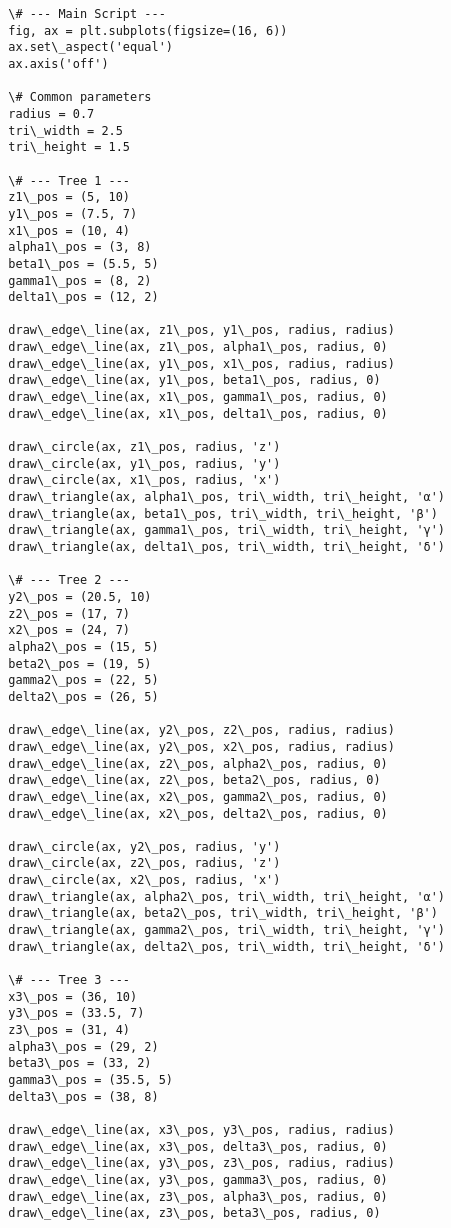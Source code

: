 \documentclass[11pt]{article}
\begin{document}
\begin{lstlisting}
  \# --- Main Script ---
  fig, ax = plt.subplots(figsize=(16, 6))
  ax.set\_aspect('equal')
  ax.axis('off')

  \# Common parameters
  radius = 0.7
  tri\_width = 2.5
  tri\_height = 1.5

  \# --- Tree 1 ---
  z1\_pos = (5, 10)
  y1\_pos = (7.5, 7)
  x1\_pos = (10, 4)
  alpha1\_pos = (3, 8)
  beta1\_pos = (5.5, 5)
  gamma1\_pos = (8, 2)
  delta1\_pos = (12, 2)

  draw\_edge\_line(ax, z1\_pos, y1\_pos, radius, radius)
  draw\_edge\_line(ax, z1\_pos, alpha1\_pos, radius, 0)
  draw\_edge\_line(ax, y1\_pos, x1\_pos, radius, radius)
  draw\_edge\_line(ax, y1\_pos, beta1\_pos, radius, 0)
  draw\_edge\_line(ax, x1\_pos, gamma1\_pos, radius, 0)
  draw\_edge\_line(ax, x1\_pos, delta1\_pos, radius, 0)

  draw\_circle(ax, z1\_pos, radius, 'z')
  draw\_circle(ax, y1\_pos, radius, 'y')
  draw\_circle(ax, x1\_pos, radius, 'x')
  draw\_triangle(ax, alpha1\_pos, tri\_width, tri\_height, 'α')
  draw\_triangle(ax, beta1\_pos, tri\_width, tri\_height, 'β')
  draw\_triangle(ax, gamma1\_pos, tri\_width, tri\_height, 'γ')
  draw\_triangle(ax, delta1\_pos, tri\_width, tri\_height, 'δ')

  \# --- Tree 2 ---
  y2\_pos = (20.5, 10)
  z2\_pos = (17, 7)
  x2\_pos = (24, 7)
  alpha2\_pos = (15, 5)
  beta2\_pos = (19, 5)
  gamma2\_pos = (22, 5)
  delta2\_pos = (26, 5)

  draw\_edge\_line(ax, y2\_pos, z2\_pos, radius, radius)
  draw\_edge\_line(ax, y2\_pos, x2\_pos, radius, radius)
  draw\_edge\_line(ax, z2\_pos, alpha2\_pos, radius, 0)
  draw\_edge\_line(ax, z2\_pos, beta2\_pos, radius, 0)
  draw\_edge\_line(ax, x2\_pos, gamma2\_pos, radius, 0)
  draw\_edge\_line(ax, x2\_pos, delta2\_pos, radius, 0)

  draw\_circle(ax, y2\_pos, radius, 'y')
  draw\_circle(ax, z2\_pos, radius, 'z')
  draw\_circle(ax, x2\_pos, radius, 'x')
  draw\_triangle(ax, alpha2\_pos, tri\_width, tri\_height, 'α')
  draw\_triangle(ax, beta2\_pos, tri\_width, tri\_height, 'β')
  draw\_triangle(ax, gamma2\_pos, tri\_width, tri\_height, 'γ')
  draw\_triangle(ax, delta2\_pos, tri\_width, tri\_height, 'δ')

  \# --- Tree 3 ---
  x3\_pos = (36, 10)
  y3\_pos = (33.5, 7)
  z3\_pos = (31, 4)
  alpha3\_pos = (29, 2)
  beta3\_pos = (33, 2)
  gamma3\_pos = (35.5, 5)
  delta3\_pos = (38, 8)

  draw\_edge\_line(ax, x3\_pos, y3\_pos, radius, radius)
  draw\_edge\_line(ax, x3\_pos, delta3\_pos, radius, 0)
  draw\_edge\_line(ax, y3\_pos, z3\_pos, radius, radius)
  draw\_edge\_line(ax, y3\_pos, gamma3\_pos, radius, 0)
  draw\_edge\_line(ax, z3\_pos, alpha3\_pos, radius, 0)
  draw\_edge\_line(ax, z3\_pos, beta3\_pos, radius, 0)


\end{lstlisting}
\end{document}
